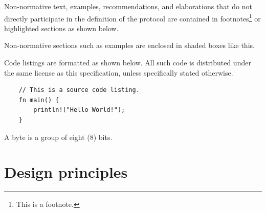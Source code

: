 Non-normative text, examples, recommendations, and elaborations that do not directly participate
in the definition of the protocol are contained in footnotes\footnote{This is a footnote.}
or highlighted sections as shown below.

\begin{remark}
    Non-normative sections such as examples are enclosed in shaded boxes like this.
\end{remark}

Code listings are formatted as shown below.
All such code is distributed under the same license as this specification, unless specifically stated otherwise.

\begin{verbatim}
    // This is a source code listing.
    fn main() {
        println!("Hello World!");
    }
\end{verbatim}

A byte is a group of eight (8) bits.

\section{Design principles}

